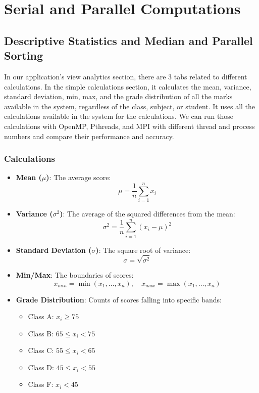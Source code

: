 \documentclass[12pt,a4paper]{article}
\begin{document}
\section{Serial and Parallel Computations}
\subsection{Descriptive Statistics and Median and Parallel Sorting}
In our application's view analytics section, there are 3 tabs related to different calculations. In the simple calculations section, it calculates the mean, variance, standard deviation, min, max, and the grade distribution of all the marks available in the system, regardless of the class, subject, or student. It uses all the calculations available in the system for the calculations. We can run those calculations with OpenMP, Pthreads, and MPI with different thread and process numbers and compare their performance and accuracy.

\subsubsection{Calculations}
\begin{itemize}
    \item \textbf{Mean ($\mu$)}: The average score:
    \begin{equation}
        \mu = \frac{1}{n} \sum_{i=1}^{n} x_i
    \end{equation}
    \item \textbf{Variance ($\sigma^2$)}: The average of the squared differences from the mean:
    \begin{equation}
        \sigma^2 = \frac{1}{n} \sum_{i=1}^{n} (x_i - \mu)^2
    \end{equation}
    \item \textbf{Standard Deviation ($\sigma$)}: The square root of variance:
    \begin{equation}
        \sigma = \sqrt{\sigma^2}
    \end{equation}
    \item \textbf{Min/Max}: The boundaries of scores:
    \begin{equation}
        x_{min} = \min(x_1, \dots, x_n), \quad x_{max} = \max(x_1, \dots, x_n)
    \end{equation}
    \item \textbf{Grade Distribution}: Counts of scores falling into specific bands:
    \begin{itemize}
        \item[] Class A: $x_i \ge 75$
        \item[] Class B: $65 \le x_i < 75$
        \item[] Class C: $55 \le x_i < 65$
        \item[] Class D: $45 \le x_i < 55$
        \item[] Class F: $x_i < 45$
    \end{itemize}
\end{itemize}
\end{document}
